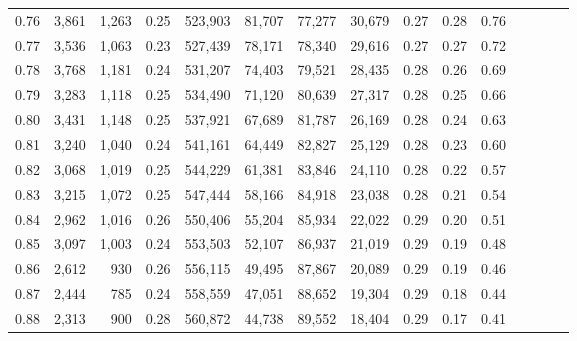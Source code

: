 \begin{tabular}{rrrcrrrrrrrrrrr}
0.76 &   3,861 &   1,263 &                                       0.25 &  523,903 &   81,707 &   77,277 &   30,679 &  0.27 &  0.28 &                         0.76 \\
0.77 &   3,536 &   1,063 &                                       0.23 &  527,439 &   78,171 &   78,340 &   29,616 &  0.27 &  0.27 &                         0.72 \\
0.78 &   3,768 &   1,181 &                                       0.24 &  531,207 &   74,403 &   79,521 &   28,435 &  0.28 &  0.26 &                         0.69 \\
0.79 &   3,283 &   1,118 &                                       0.25 &  534,490 &   71,120 &   80,639 &   27,317 &  0.28 &  0.25 &                         0.66 \\
0.80 &   3,431 &   1,148 &                                       0.25 &  537,921 &   67,689 &   81,787 &   26,169 &  0.28 &  0.24 &                         0.63 \\
0.81 &   3,240 &   1,040 &                                       0.24 &  541,161 &   64,449 &   82,827 &   25,129 &  0.28 &  0.23 &                         0.60 \\
0.82 &   3,068 &   1,019 &                                       0.25 &  544,229 &   61,381 &   83,846 &   24,110 &  0.28 &  0.22 &                         0.57 \\
0.83 &   3,215 &   1,072 &                                       0.25 &  547,444 &   58,166 &   84,918 &   23,038 &  0.28 &  0.21 &                         0.54 \\
0.84 &   2,962 &   1,016 &                                       0.26 &  550,406 &   55,204 &   85,934 &   22,022 &  0.29 &  0.20 &                         0.51 \\
0.85 &   3,097 &   1,003 &                                       0.24 &  553,503 &   52,107 &   86,937 &   21,019 &  0.29 &  0.19 &                         0.48 \\
0.86 &   2,612 &     930 &                                       0.26 &  556,115 &   49,495 &   87,867 &   20,089 &  0.29 &  0.19 &                         0.46 \\
0.87 &   2,444 &     785 &                                       0.24 &  558,559 &   47,051 &   88,652 &   19,304 &  0.29 &  0.18 &                         0.44 \\
0.88 &   2,313 &     900 &                                       0.28 &  560,872 &   44,738 &   89,552 &   18,404 &  0.29 &  0.17 &                         0.41 \\

\end{tabular}
